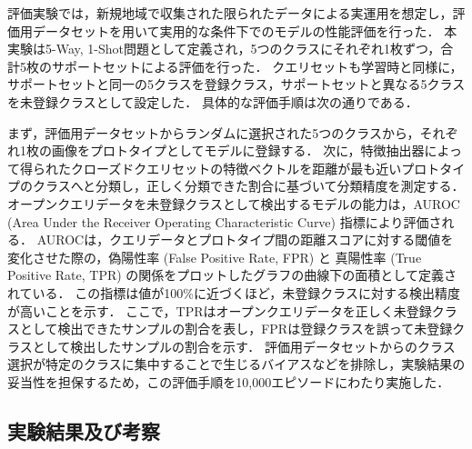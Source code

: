 評価実験では，新規地域で収集された限られたデータによる実運用を想定し，評価用データセットを用いて実用的な条件下でのモデルの性能評価を行った．
本実験は5-Way, 1-Shot問題として定義され，5つのクラスにそれぞれ1枚ずつ，合計5枚のサポートセットによる評価を行った．
クエリセットも学習時と同様に，サポートセットと同一の5クラスを登録クラス，サポートセットと異なる5クラスを未登録クラスとして設定した．
具体的な評価手順は次の通りである．

まず，評価用データセットからランダムに選択された5つのクラスから，それぞれ1枚の画像をプロトタイプとしてモデルに登録する．
次に，特徴抽出器によって得られたクローズドクエリセットの特徴ベクトルを距離が最も近いプロトタイプのクラスへと分類し，正しく分類できた割合に基づいて分類精度を測定する．
オープンクエリデータを未登録クラスとして検出するモデルの能力は，AUROC (Area Under the Receiver Operating Characteristic Curve) 指標により評価される．
AUROCは，クエリデータとプロトタイプ間の距離スコアに対する閾値を変化させた際の，偽陽性率 (False Positive Rate, FPR) と
真陽性率 (True Positive Rate, TPR) の関係をプロットしたグラフの曲線下の面積として定義されている．
この指標は値が100\%に近づくほど，未登録クラスに対する検出精度が高いことを示す．
ここで，TPRはオープンクエリデータを正しく未登録クラスとして検出できたサンプルの割合を表し，FPRは登録クラスを誤って未登録クラスとして検出したサンプルの割合を示す．
評価用データセットからのクラス選択が特定のクラスに集中することで生じるバイアスなどを排除し，実験結果の妥当性を担保するため，この評価手順を10,000エピソードにわたり実施した．

\subsection{実験結果及び考察}


